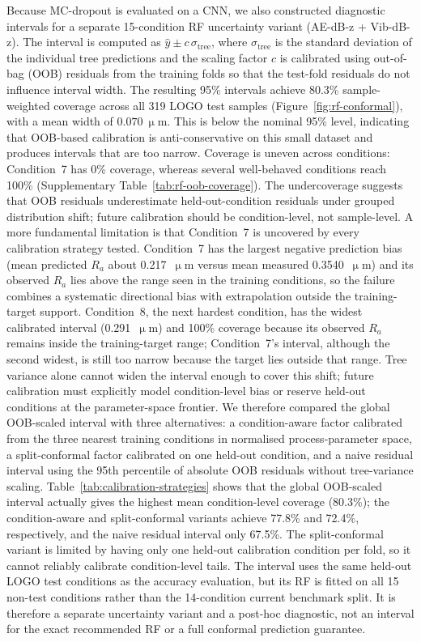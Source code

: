 Because MC-dropout is evaluated on a CNN, we also constructed diagnostic
intervals for a separate 15-condition RF uncertainty variant
(AE-dB-z + Vib-dB-z). The interval is computed as
\(\hat y \pm c \, \sigma_{\text{tree}}\), where
\(\sigma_{\text{tree}}\) is the standard deviation of the individual
tree predictions and the scaling factor \(c\) is calibrated using
out-of-bag (OOB) residuals from the training folds so that the test-fold
residuals do not influence interval width. The resulting 95\% intervals
achieve 80.3\% sample-weighted coverage across all 319 LOGO test samples
(Figure~\ref{fig:rf-conformal}), with a mean width of
\(0.070~\upmu\)m. This is below the nominal 95\% level, indicating that
OOB-based calibration is anti-conservative on this small dataset and
produces intervals that are too narrow. Coverage is uneven across
conditions: Condition~7 has 0\% coverage, whereas several well-behaved
conditions reach 100\% (Supplementary
Table~\ref{tab:rf-oob-coverage}). The undercoverage suggests that OOB
residuals underestimate held-out-condition residuals under grouped
distribution shift; future calibration should be condition-level, not
sample-level. A more fundamental limitation is that Condition~7 is
uncovered by every calibration strategy tested. Condition~7 has the
largest negative prediction bias (mean predicted $R_a$ about 0.217~\(\upmu\)m
versus mean measured 0.3540~\(\upmu\)m) and its observed $R_a$ lies above the
range seen in the training conditions, so the failure combines a
systematic directional bias with extrapolation outside the training-target
support. Condition~8, the next hardest condition, has the widest
calibrated interval (0.291~\(\upmu\)m) and 100\% coverage because its
observed $R_a$ remains inside the training-target range; Condition~7's
interval, although the second widest, is still too narrow because the
target lies outside that range. Tree variance alone cannot widen the
interval enough to cover this shift; future calibration must explicitly
model condition-level bias or reserve held-out conditions at the
parameter-space frontier.
We therefore compared the global OOB-scaled interval with three alternatives: a condition-aware factor calibrated from the three
nearest training conditions in normalised process-parameter space, a
split-conformal factor calibrated on one held-out condition, and a naive
residual interval using the 95th percentile of absolute OOB residuals
without tree-variance scaling. Table~\ref{tab:calibration-strategies}
shows that the global OOB-scaled interval actually gives the highest
mean condition-level coverage (80.3\%); the condition-aware and
split-conformal variants achieve 77.8\% and 72.4\%, respectively, and the
naive residual interval only 67.5\%. The split-conformal variant is
limited by having only one held-out calibration condition per fold, so it
cannot reliably calibrate condition-level tails. The interval uses the same
held-out LOGO test conditions as the accuracy evaluation, but its RF is fitted
on all 15 non-test conditions rather than the 14-condition current benchmark
split. It is therefore a separate uncertainty variant and a post-hoc
diagnostic, not an interval for the exact recommended RF or a full conformal
prediction guarantee.

